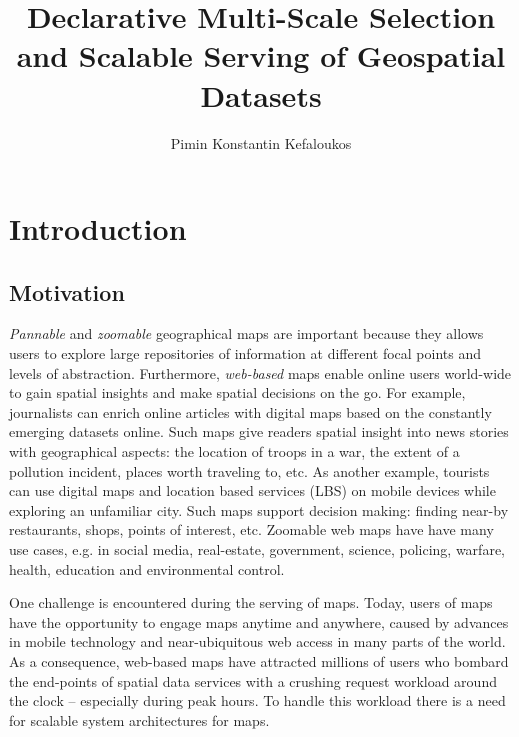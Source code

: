 \documentclass[11pt, oneside]{report}   	%
\title{Declarative Multi-Scale Selection and Scalable Serving of Geospatial Datasets}
\author{Pimin Konstantin Kefaloukos}
\begin{document}
\maketitle

\tableofcontents

\chapter{Introduction}


\section{Motivation}
\emph{Pannable} and \emph{zoomable} geographical maps are important because they allows users to explore large repositories of information at different focal points and levels of abstraction. Furthermore, \emph{web-based} maps enable online users world-wide to gain spatial insights and make spatial decisions on the go. For example, journalists can enrich online articles with digital maps based on the constantly emerging datasets online. Such maps give readers spatial insight into news stories with geographical aspects: the location of troops in a war, the extent of a pollution incident, places worth traveling to, etc. As another example, tourists can use digital maps and location based services (LBS) on mobile devices while exploring an unfamiliar city. Such maps support decision making: finding near-by restaurants, shops, points of interest, etc. Zoomable web maps have have many use cases, e.g. in social media, real-estate, government, science, policing, warfare, health, education and environmental control.%

One challenge is encountered during the serving of maps. Today, users of maps have the opportunity to engage maps anytime and anywhere, caused by advances in mobile technology and near-ubiquitous web access in many parts of the world. As a consequence, web-based maps have attracted millions of users who bombard the end-points of spatial data services with a crushing request workload around the clock -- especially during peak hours. To handle this workload there is a need for scalable system architectures for maps. %
\end{document}
